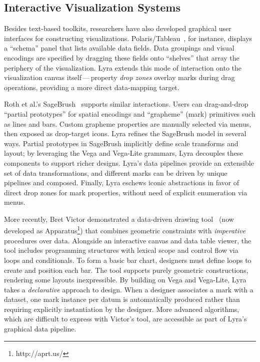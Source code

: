 \subsection{Interactive Visualization Systems}

Besides text-based toolkits, researchers have also developed graphical user
interfaces for constructing visualizations.
Polaris/Tableau~\cite{stolte:polaris}, for instance, displays a ``schema'' panel
that lists available data fields. Data groupings and visual encodings are
specified by dragging these fields onto ``shelves'' that array the periphery of
the visualization. Lyra extends this mode of interaction onto the visualization
canvas itself\,---\,property \emph{drop zones} overlay marks during drag
operations, providing a more direct data-mapping target.

Roth et al.'s SageBrush~\cite{roth:sagebrush} supports similar interactions.
Users can drag-and-drop ``partial prototypes'' for spatial encodings and
``grapheme'' (mark) primitives such as lines and bars. Custom grapheme
properties are manually selected via menus, then exposed as drop-target icons.
Lyra refines the SageBrush model in several ways. Partial prototypes in
SageBrush implicitly define scale transforms and layout; by leveraging the Vega
and Vega-Lite grammars, Lyra decouples these components to support richer
designs. Lyra's data pipelines provide an extensible set of data
transformations, and different marks can be driven by unique pipelines and
composed. Finally, Lyra eschews iconic abstractions in favor of direct drop
zones for mark properties, without need of explicit enumeration via menus.

More recently, Bret Victor demonstrated a data-driven drawing
tool~\cite{victor:drawing} (now developed as
Apparatus\footnote{http://aprt.us/}) that combines geometric constraints with
\emph{imperative} procedures over data. Alongside an interactive canvas and data
table viewer, the tool includes programming structures with lexical scope and
control flow via loops and conditionals. To form a basic bar chart, designers
must define loops to create and position each bar. The tool supports purely
geometric constructions, rendering some layouts inexpressible. By building on
Vega and Vega-Lite, Lyra takes a \emph{declarative} approach to design. When a
designer associates a mark with a dataset, one mark instance per datum is
automatically produced rather than requiring explicitly instantiation by the
designer. More advanced algorithms, which are difficult to express with Victor's
tool, are accessible as part of Lyra's graphical data pipeline.

